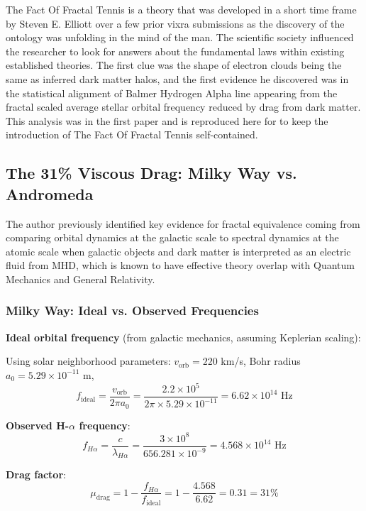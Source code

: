 \documentclass[11pt,a4paper]{article}
\begin{document}
  The Fact Of Fractal Tennis is a theory that was developed in a short time frame by Steven E. Elliott over a few prior vixra submissions as the discovery of the ontology was unfolding in the mind of the man. The scientific society influenced the researcher to look for answers about the fundamental laws within existing established theories. The first clue was the shape of electron clouds being the same as inferred dark matter halos, and the first evidence he discovered was in the statistical alignment of Balmer Hydrogen Alpha line appearing from the fractal scaled average stellar orbital frequency reduced by drag from dark matter. This analysis was in the first paper and is reproduced here for to keep the introduction of The Fact Of Fractal Tennis self-contained.

  \subsection{The 31\% Viscous Drag: Milky Way vs. Andromeda}

    The author previously identified key evidence for fractal equivalence coming from comparing orbital dynamics at the galactic scale to spectral dynamics at the atomic scale when galactic objects and dark matter is interpreted as an electric fluid from MHD, which is known to have effective theory overlap with Quantum Mechanics and General Relativity.    

  \subsubsection{Milky Way: Ideal vs. Observed Frequencies}

    \noindent\textbf{Ideal orbital frequency} (from galactic mechanics, assuming Keplerian scaling):

      Using solar neighborhood parameters: $v_{\text{orb}} = 220$ km/s, Bohr radius $a_0 = 5.29 \times 10^{-11}$ m,
      \[
      f_{\text{ideal}} = \frac{v_{\text{orb}}}{2\pi a_0} = \frac{2.2 \times 10^5}{2\pi \times 5.29 \times 10^{-11}} = 6.62 \times 10^{14} \text{ Hz}
      \]

    \noindent\textbf{Observed H-$\alpha$ frequency}:
      \[
      f_{H\alpha} = \frac{c}{\lambda_{H\alpha}} = \frac{3 \times 10^8}{656.281 \times 10^{-9}} = 4.568 \times 10^{14} \text{ Hz}
      \]

    \noindent\textbf{Drag factor}:
      \[
      \mu_{\text{drag}} = 1 - \frac{f_{H\alpha}}{f_{\text{ideal}}} = 1 - \frac{4.568}{6.62} = 0.31 = \boxed{31\%}
      \]
\end{document}
